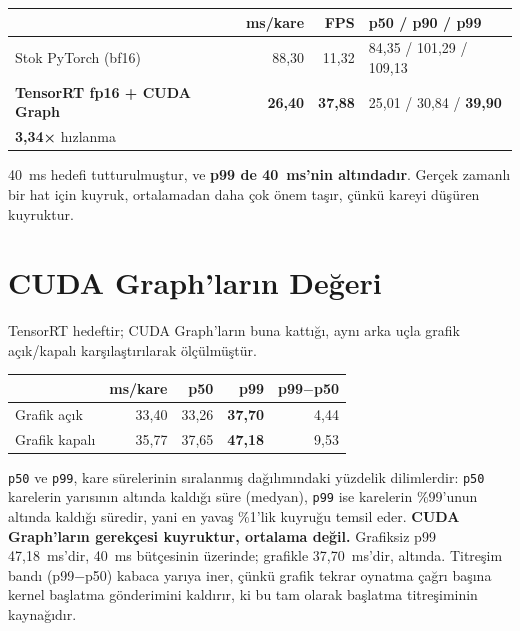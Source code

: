 \begin{olcum}[title={Ölçüldü (cihazda, 500 kare, 20 ısınma hariç)}]
\begin{center}
\begin{tabular}{lrrl}
  \toprule
  & ms/kare & FPS & p50 / p90 / p99 \\
  \midrule
  Stok PyTorch (bf16) & 88,30 & 11,32 & 84,35 / 101,29 / 109,13 \\
  \textbf{TensorRT fp16 + CUDA Graph} & \textbf{26,40} & \textbf{37,88} &
    25,01 / 30,84 / \textbf{39,90} \\
  \midrule
  \multicolumn{4}{l}{\textbf{3,34×} hızlanma} \\
  \bottomrule
\end{tabular}
\end{center}
\end{olcum}

40~ms hedefi tutturulmuştur, ve \textbf{p99 de 40~ms'nin altındadır}.
Gerçek zamanlı bir hat için kuyruk, ortalamadan daha çok önem taşır,
çünkü kareyi düşüren kuyruktur.

\section{CUDA Graph'ların Değeri}
\label{sec:cuda-graph}

TensorRT hedeftir; CUDA Graph'ların buna kattığı, aynı arka uçla
grafik açık/kapalı karşılaştırılarak ölçülmüştür.

\begin{olcum}[title={Ölçüldü (cihazda, 500 kare)}]
\begin{center}
\begin{tabular}{lrrrr}
  \toprule
  & ms/kare & p50 & p99 & p99$-$p50 \\
  \midrule
  Grafik açık & 33,40 & 33,26 & \textbf{37,70} & 4,44 \\
  Grafik kapalı & 35,77 & 37,65 & \textbf{47,18} & 9,53 \\
  \bottomrule
\end{tabular}
\end{center}
\end{olcum}

\texttt{p50} ve \texttt{p99}, kare sürelerinin sıralanmış
dağılımındaki yüzdelik dilimlerdir: \texttt{p50} karelerin yarısının
altında kaldığı süre (medyan), \texttt{p99} ise karelerin
\%99'unun altında kaldığı süredir, yani en yavaş \%1'lik kuyruğu
temsil eder. \textbf{CUDA Graph'ların gerekçesi kuyruktur, ortalama
değil.} Grafiksiz p99 47,18~ms'dir, 40~ms bütçesinin üzerinde;
grafikle 37,70~ms'dir, altında. Titreşim bandı (p99$-$p50) kabaca
yarıya iner, çünkü grafik tekrar oynatma çağrı başına kernel başlatma
gönderimini kaldırır, ki bu tam olarak başlatma titreşiminin
kaynağıdır.

